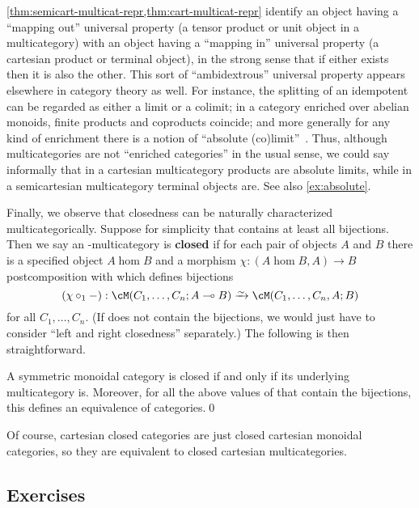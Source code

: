 \begin{rmk}\label{rmk:absolute}
  \cref{thm:semicart-multicat-repr,thm:cart-multicat-repr} identify an object having a ``mapping out'' universal property (a tensor product or unit object in a multicategory) with an object having a ``mapping in'' universal property (a cartesian product or terminal object), in the strong sense that if either exists then it is also the other.
  This sort of ``ambidextrous'' universal property appears elsewhere in category theory as well.
  For instance, the splitting of an idempotent can be regarded as either a limit or a colimit; in a category enriched over abelian monoids, finite products and coproducts coincide; and more generally for any kind of enrichment there is a notion of ``absolute (co)limit''~\cite{street:absolute}.
  Thus, although multicategories are not ``enriched categories'' in the usual sense, we could say informally that in a cartesian multicategory products are absolute limits, while in a semicartesian multicategory terminal objects are.
  See also \cref{ex:absolute}.
\end{rmk}

Finally, we observe that closedness can be naturally characterized multicategorically.
Suppose for simplicity that \fS contains at least all bijections.
Then we say an \fS-multicategory is \textbf{closed} if for each pair of objects $A$ and $B$ there is a specified object $A\hom B$ and a morphism $\chi : (A\hom B,A) \to B$ postcomposition with which defines bijections
\[ (\chi\circ_1 -): \cM(C_1,\dots,C_n;A\hom B) \toiso \cM(C_1,\dots,C_n,A;B) \]
for all $C_1,\dots,C_n$.
(If \fS does not contain the bijections, we would just have to consider ``left and right closedness'' separately.)
The following is then straightforward.

\begin{thm}\label{thm:moncat-repr-closed}
  A symmetric monoidal category is closed if and only if its underlying multicategory is.
  Moreover, for all the above values of \fS that contain the bijections, this defines an equivalence of categories.\qed
\end{thm}

Of course, cartesian closed categories are just closed cartesian monoidal categories, so they are equivalent to closed cartesian multicategories.

\subsection*{Exercises}

